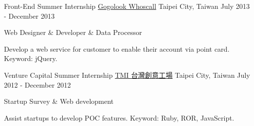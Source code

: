 \begin{cventries}
  \cventry
    {Front-End Summer Internship} %
    {\href{https://whoscall.com}{Gogolook Whoscall}} %
    {Taipei City, Taiwan} %
    {July 2013 - December 2013} %
    {
      \begin{cvitems} %
        \item {Web Designer \& Developer \& Data Processor}
        \item {Develop a web service for customer to enable their account via point card. Keyword: jQuery.}
        \end{cvitems}
    }

  \cventry
    {Venture Capital Summer Internship} %
    {\href{http://tmi.vc}{TMI 台灣創意工場}} %
    {Taipei City, Taiwan} %
    {July 2012 - December 2012} %
    {
      \begin{cvitems} %
        \item {Startup Survey \& Web development}
        \item {Assist startups to develop POC features. Keyword: Ruby, ROR, JavaScript.}
      \end{cvitems}
    }

\end{cventries}
